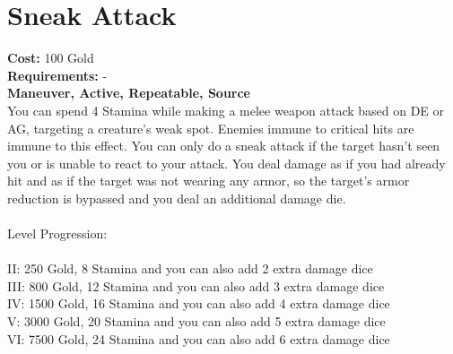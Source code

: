 \section{Sneak Attack}
\textbf{Cost:} 100 Gold\\
\textbf{Requirements:} -\\
\textbf{Maneuver, Active, Repeatable, Source}\\
You can spend 4 Stamina while making a melee weapon attack based on DE or AG, targeting a creature’s weak spot. Enemies immune to critical hits are immune to this effect. You can only do a sneak attack if the target hasn’t seen you or is unable to react to your attack. You deal damage as if you had already hit and as if the target was not wearing any armor, so the target’s armor reduction is bypassed and you deal an additional damage die.\\
\\
Level Progression:\\
\\
II: 250 Gold, 8 Stamina and you can also add 2 extra damage dice\\
III: 800 Gold, 12 Stamina and you can also add 3 extra damage dice\\
IV: 1500 Gold, 16 Stamina and you can also add 4 extra damage dice\\
V: 3000 Gold, 20 Stamina and you can also add 5 extra damage dice\\
VI: 7500 Gold, 24 Stamina and you can also add 6 extra damage dice\\